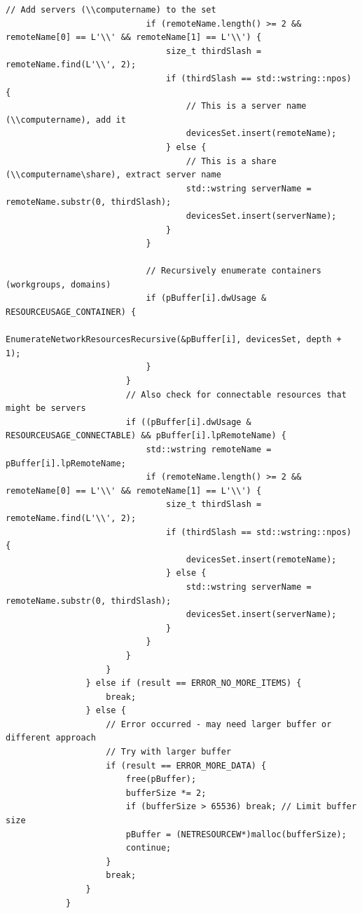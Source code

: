 \begin{lstlisting}[style=CodeListing]
                            // Add servers (\\computername) to the set
                            if (remoteName.length() >= 2 && remoteName[0] == L'\\' && remoteName[1] == L'\\') {
                                size_t thirdSlash = remoteName.find(L'\\', 2);
                                if (thirdSlash == std::wstring::npos) {
                                    // This is a server name (\\computername), add it
                                    devicesSet.insert(remoteName);
                                } else {
                                    // This is a share (\\computername\share), extract server name
                                    std::wstring serverName = remoteName.substr(0, thirdSlash);
                                    devicesSet.insert(serverName);
                                }
                            }
                            
                            // Recursively enumerate containers (workgroups, domains)
                            if (pBuffer[i].dwUsage & RESOURCEUSAGE_CONTAINER) {
                                EnumerateNetworkResourcesRecursive(&pBuffer[i], devicesSet, depth + 1);
                            }
                        }
                        // Also check for connectable resources that might be servers
                        if ((pBuffer[i].dwUsage & RESOURCEUSAGE_CONNECTABLE) && pBuffer[i].lpRemoteName) {
                            std::wstring remoteName = pBuffer[i].lpRemoteName;
                            if (remoteName.length() >= 2 && remoteName[0] == L'\\' && remoteName[1] == L'\\') {
                                size_t thirdSlash = remoteName.find(L'\\', 2);
                                if (thirdSlash == std::wstring::npos) {
                                    devicesSet.insert(remoteName);
                                } else {
                                    std::wstring serverName = remoteName.substr(0, thirdSlash);
                                    devicesSet.insert(serverName);
                                }
                            }
                        }
                    }
                } else if (result == ERROR_NO_MORE_ITEMS) {
                    break;
                } else {
                    // Error occurred - may need larger buffer or different approach
                    // Try with larger buffer
                    if (result == ERROR_MORE_DATA) {
                        free(pBuffer);
                        bufferSize *= 2;
                        if (bufferSize > 65536) break; // Limit buffer size
                        pBuffer = (NETRESOURCEW*)malloc(bufferSize);
                        continue;
                    }
                    break;
                }
            }
            

\end{lstlisting}
